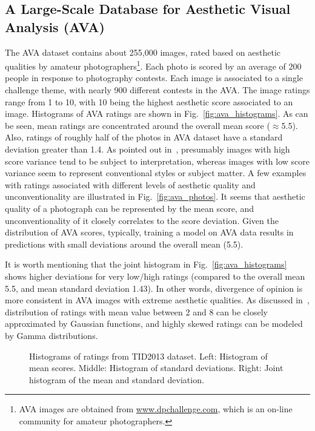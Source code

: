 \documentclass[10pt,twocolumn,twoside]{IEEEtran}
\begin{document}
 \subsection{A Large-Scale Database for Aesthetic Visual Analysis (AVA) \cite{murray2012ava}}
 The AVA dataset contains about 255,000 images, rated based on aesthetic qualities by amateur photographers\footnote{AVA images are obtained from \hyperref[www.dpchallenge.com]{www.dpchallenge.com}, which is an on-line community for amateur photographers.}. Each photo is scored by an average of 200 people in response to photography contests. Each image is associated to a single challenge theme, with nearly 900 different contests in the AVA. The image ratings range from 1 to 10, with 10 being the highest aesthetic score associated to an image. Histograms of AVA ratings are shown in Fig.~\ref{fig:ava_histograms}. As can be seen, mean ratings are concentrated around the overall mean score ($\approx$5.5). Also, ratings of roughly half of the photos in AVA dataset have a standard deviation greater than 1.4. As pointed out in~\cite{murray2012ava}, presumably images with high score variance tend to be subject to interpretation, whereas images with low score variance seem to represent conventional styles or subject matter. A few examples with ratings associated with different levels of aesthetic quality and unconventionality are illustrated in Fig.~\ref{fig:ava_photos}. It seems that aesthetic quality of a photograph can be represented by the mean score, and unconventionality of it closely correlates to the score deviation. Given the distribution of AVA scores, typically, training a model on AVA data results in predictions with small deviations around the overall mean (5.5). 
 
It is worth mentioning that the joint histogram in Fig.~\ref{fig:ava_histograms} shows higher deviations for very low/high ratings (compared to the overall mean 5.5, and mean standard deviation 1.43). In other words, divergence of opinion is more consistent in AVA images with extreme aesthetic qualities. As discussed in~\cite{murray2012ava}, distribution of ratings with mean value between 2 and 8 can be closely approximated by Gaussian functions, and highly skewed ratings can be modeled by Gamma distributions.

 \begin{figure*}[!t]
\vspace{-0 mm}
\begin{center}
\end{center}
\vspace{-5 mm}
{\caption{Histograms of ratings from TID2013 dataset\cite{ponomarenko2013color}. Left: Histogram of mean scores. Middle: Histogram of standard deviations. Right: Joint histogram of the mean and standard deviation. \label{fig:tid_histograms}}}
\vspace{-0 mm}
\end{figure*}
\end{document}
